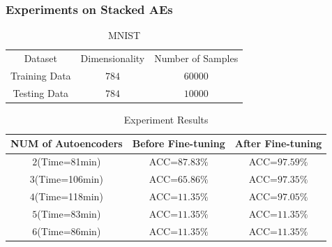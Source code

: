 \documentclass{beamer}
\begin{document}
\begin{CJK*}{UTF8}{gbsn}
\begin{frame}\frametitle{Experiments on Stacked AEs}
\begin{table}
\begin{tabular}{|c|c|c|}
\rowcolor{rowcolor1}
Dataset & Dimensionality & Number of Samples\\
\rowcolor{rowcolor2}
Training Data & $784$ & $60000$\\
\rowcolor{rowcolor3}
Testing Data & $784$ & $10000$\\
\end{tabular}
\caption{MNIST}
\end{table}
\begin{table}
\begin{tabular}{|c|c|c|}
\hline
\rowcolor{rowcolor1}
NUM of Autoencoders & Before Fine-tuning & After Fine-tuning\\
\hline
\rowcolor{rowcolor2}
$2$(Time=81min) & ACC=$87.83\%$ & ACC=$97.59\%$\\
\hline
\rowcolor{rowcolor3}
$3$(Time=106min) & ACC=$65.86\%$ & ACC=$97.35\%$\\
\hline
\rowcolor{rowcolor4}
$4$(Time=118min) & ACC=$11.35\%$ & ACC=$97.05\%$\\
\hline
\rowcolor{rowcolor5}
$5$(Time=83min) & ACC=$11.35\%$ & ACC=$11.35\%$\\
\hline
\rowcolor{rowcolor6}
$6$(Time=86min) & ACC=$11.35\%$ & ACC=$11.35\%$\\
\hline
\end{tabular}
\caption{Experiment Results}
\end{table}
\end{frame}

\end{CJK*}
\end{document}
